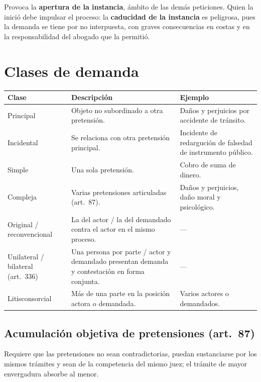 \documentclass[12pt,oneside]{book}
\renewcommand{\arraystretch}{1.15}
\begin{document}
Provoca la \textbf{apertura de la instancia}, ámbito de las demás peticiones. Quien la inició debe impulsar el proceso: la \textbf{caducidad de la instancia} es peligrosa, pues la demanda se tiene por no interpuesta, con graves consecuencias en costas y en la responsabilidad del abogado que la permitió.

\section{Clases de demanda}

\begin{table}[H]
\centering
\renewcommand{\arraystretch}{1.2}
\begin{tabularx}{\textwidth}{>{\RaggedRight\arraybackslash}p{}>{\RaggedRight\arraybackslash}X>{\RaggedRight\arraybackslash}X}
\toprule
\textbf{Clase} & \textbf{Descripción} & \textbf{Ejemplo} \\
\midrule
Principal & Objeto no subordinado a otra pretensión. & Daños y perjuicios por accidente de tránsito. \\
Incidental & Se relaciona con otra pretensión principal. & Incidente de redargución de falsedad de instrumento público. \\
Simple & Una sola pretensión. & Cobro de suma de dinero. \\
Compleja & Varias pretensiones articuladas (art.~87). & Daños y perjuicios, daño moral y psicológico. \\
Original / reconvencional & La del actor / la del demandado contra el actor en el mismo proceso. & --- \\
Unilateral / bilateral (art.~336) & Una persona por parte / actor y demandado presentan demanda y contestación en forma conjunta. & --- \\
Litisconsorcial & Más de una parte en la posición actora o demandada. & Varios actores o demandados. \\
\bottomrule
\end{tabularx}
\end{table}

\subsection{Acumulación objetiva de pretensiones (art.~87)}

Requiere que las pretensiones no sean contradictorias, puedan sustanciarse por los mismos trámites y sean de la competencia del mismo juez; el trámite de mayor envergadura absorbe al menor.
\end{document}
